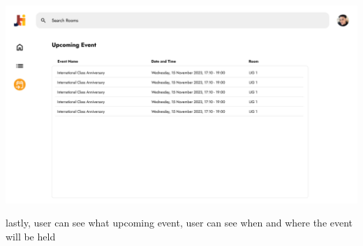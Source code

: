 \documentclass[12pt,titlepage,a4paper]{report}
\begin{document}
    \begin{center}
        \includegraphics[width=\textwidth]{images/figures/UIUX/upcoming.png}\\
    \end{center}
    lastly, user can see what upcoming event, user can see when and where the event will be held
    \newpage
\end{document}
